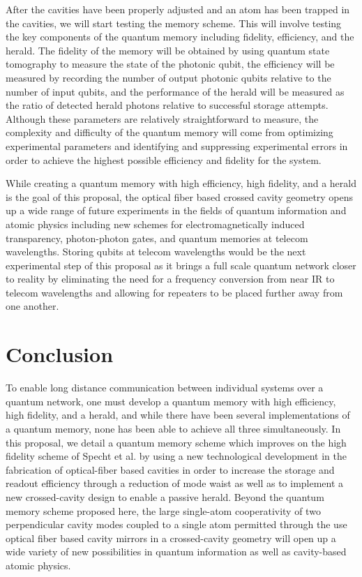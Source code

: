 \documentclass[a4paper]{article}
\begin{document}
After the cavities have been properly adjusted and an atom has been trapped in the cavities, we will start testing the memory scheme. This will involve testing the key components of the quantum memory including fidelity, efficiency, and the herald. The fidelity of the memory will be obtained by using quantum state tomography to measure the state of the photonic qubit, the efficiency will be measured by recording the number of output photonic qubits relative to the number of input qubits, and the performance of the herald will be measured as the ratio of detected herald photons relative to successful storage attempts. Although these parameters are relatively straightforward to measure, the complexity and difficulty of the quantum memory will come from optimizing experimental parameters and identifying and suppressing experimental errors in order to achieve the highest possible efficiency and fidelity for the system.

While creating a quantum memory with high efficiency, high fidelity, and a herald is the goal of this proposal, the optical fiber based crossed cavity geometry opens up a wide range of future experiments in the fields of quantum information and atomic physics including new schemes for electromagnetically induced transparency, photon-photon gates, and quantum memories at telecom wavelengths. Storing qubits at telecom wavelengths would be the next experimental step of this proposal as it brings a full scale quantum network closer to reality by eliminating the need for a frequency conversion from near IR to telecom wavelengths and allowing for repeaters to be placed further away from one another.

\section{Conclusion}

\indent\indent To enable long distance communication between individual systems over a quantum network, one must develop a quantum memory with high efficiency, high fidelity, and a herald, and while there have been several implementations of a quantum memory, none has been able to achieve all three simultaneously. In this proposal, we detail a quantum memory scheme which improves on the high fidelity scheme of Specht et al. by using a new technological development in the fabrication of optical-fiber based cavities in order to increase the storage and readout efficiency through a reduction of mode waist as well as to implement a new crossed-cavity design to enable a passive herald.  Beyond the quantum memory scheme proposed here, the large single-atom cooperativity of two perpendicular cavity modes coupled to a single atom permitted through the use optical fiber based cavity mirrors in a crossed-cavity geometry will open up a wide variety of new possibilities in quantum information as well as cavity-based atomic physics.


\printbibliography
\end{document}
